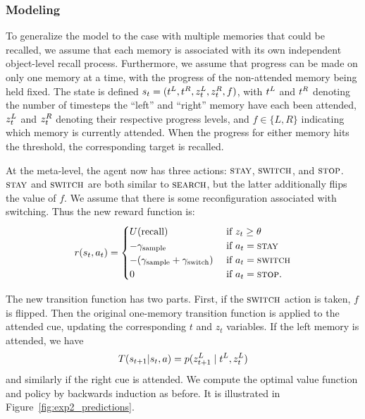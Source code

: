 \subsubsection{Modeling}


To generalize the model to the case with multiple memories that could be recalled, we assume that each memory is associated with its own independent object-level recall process. Furthermore, we assume that progress can be made on only one memory at a time, with the progress of the non-attended memory being held fixed. The state is defined $s_t = (t^{L}, t^{R}, z_t^{L}, z_t^{R}, f)$, with $t^{L}$ and $t^{R}$ denoting the number of timesteps the ``left'' and ``right'' memory have each been attended, $z_t^{L}$ and $z_t^{R}$ denoting their respective progress levels, and $f \in \{L, R\}$ indicating which memory is currently attended. When the progress for either memory hits the threshold, the corresponding target is recalled.

At the meta-level, the agent now has three actions: $\textsc{stay}$, $\textsc{switch}$, and $\textsc{stop}$. $\textsc{stay}$ and $\textsc{switch}$ are both similar to $\textsc{search}$, but the latter additionally flips the value of $f$. We assume that there is some reconfiguration associated with switching. Thus the new reward function is:
%
\begin{equation}\label{eq:reward2}
  r(s_t, a_t) = \begin{cases} 
    U({\text{recall}}) & \text{ if } z_t \geq \theta \\
    -\gamma_\text{sample} & \text{ if } a_t = \textsc{stay} \\
    -(\gamma_\text{sample} + \gamma_\text{switch})  & \text{ if } a_t = \textsc{switch} \\
    0 & \text{ if } a_t = \textsc{stop}.
  \end{cases}
\end{equation}

The new transition function has two parts. First, if the $\textsc{switch}$ action is taken, $f$ is flipped. Then the original one-memory transition function is applied to the attended cue, updating the corresponding $t$ and $z_t$ variables. If the left memory is attended, we have
%
\begin{equation}\label{eq:transition2}
  T(s_{t+1} | s_t, a) = p(z_{t+1}^{L} \mid t^{L}, z_t^{L})
\end{equation}
and similarly if the right cue is attended. We compute the optimal value function and policy by backwards induction as before. It is illustrated in Figure~\ref{fig:exp2_predictions}.


